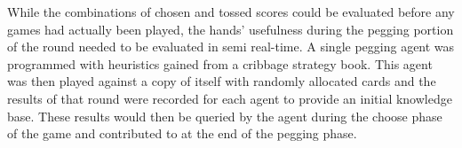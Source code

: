 

While the combinations of chosen and tossed scores could be evaluated before any
games had actually been played,
the hands' usefulness during the pegging portion of the round needed to be
evaluated in semi real-time.
%
A single pegging agent was programmed with heuristics gained from %
a cribbage strategy book.%
\cite{cribbage_strategy_guide}
%
This agent was then played against a copy of itself with randomly allocated
cards and the results of that round were recorded for each agent to provide an
initial knowledge base.
%
These results would then be queried by the agent during the choose phase of the
game and contributed to at the end of the pegging phase.

